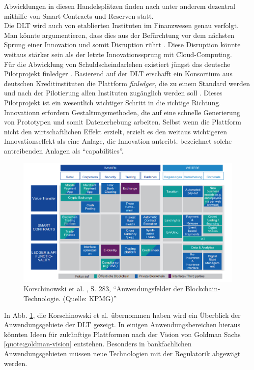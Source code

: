 Abwicklungen in diesen Handelsplätzen finden nach \citet{Foundation2019Deconstructing} unter anderem dezentral mithilfe von Smart-Contracts und Reserven statt.
\medskip
\\
Die \ac{DLT} wird auch von etablierten Instituten im Finanzwesen genau verfolgt. Man könnte argumentieren, dass dies aus der Befürchtung vor dem nächsten Sprung einer Innovation und somit Disruption rührt \cite{Ganswindt2006, Alt2017}. Diese Disruption könnte weitaus stärker sein als der letzte Innovationssprung mit Cloud-Computing.
\medskip
\\
Für die Abwicklung von Schuldscheindarlehen existiert jüngst das deutsche Pilotprojekt finledger \cite{finledger}. 
Basierend auf der \ac{DLT} erschafft ein Konsortium aus deutschen Kreditinstituten die Plattform \emph{finledger}, die zu einem Standard werden und nach der Pilotierung allen Instituten zugänglich werden soll \cite{finledger}. Dieses Pilotprojekt ist ein wesentlich wichtiger Schritt in die richtige Richtung. Innovationn erfordern Gestaltungsmethoden, die auf eine schnelle Generierung von Prototypen und somit Datenerhebung arbeiten. Selbst wenn die Plattform nicht den wirtschaftlichen Effekt erzielt, erzielt es den weitaus wichtigeren Innovationseffekt als eine Anlage, die Innovation antreibt\cite{Ganswindt2006}. \citet{Koch2016} bezeichnet solche antreibenden Anlagen als \enquote{capabilities}.

\begin{figure}[htbp]
 \centering
 \includegraphics[width=1.0\textwidth]{gfx/blockchainanwendung.PNG}
 \caption{Korschinowski et al. \cite{Korschinowski2018}, S. 283, \enquote{Anwendungsfelder der Blockchain-Technologie. (Quelle: KPMG)}\label{fig:blockchain}}
\end{figure}

In Abb. \ref{fig:blockchain}, die Korschinowski et al. \cite{Korschinowski2018} übernommen haben wird ein Überblick der Anwendungsgebiete der \ac{DLT} gezeigt. In einigen Anwendungsbereichen hieraus könnten Ideen für zukünftige Plattformen nach der Vision von Goldman Sachs \ref{quote:goldman-vision} entstehen. Besonders in bankfachlichen Anwendungsgebieten müssen neue Technologien mit der Regulatorik abgewägt werden.

